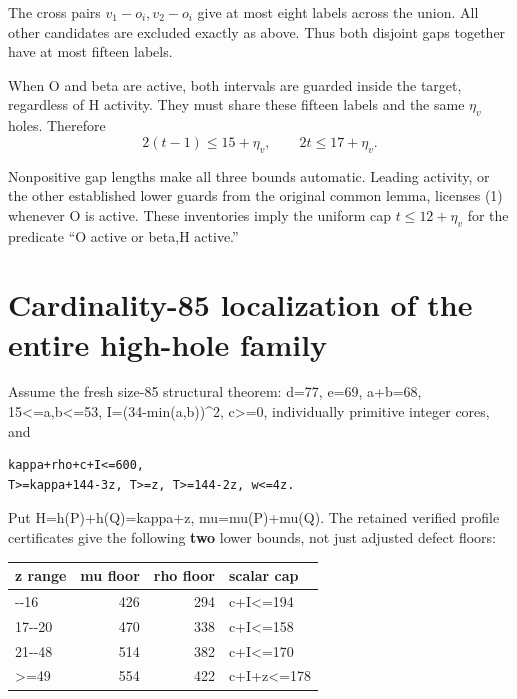 \documentclass[10pt,a4paper]{article}
\theoremstyle{definition}
\begin{document}
The cross pairs \(v_1-o_i,\allowbreak{}v_2-o_i\) give at most eight labels across the
union. All other candidates are excluded exactly as above. Thus both
disjoint gaps together have at most fifteen labels.

When O and beta are active,\allowbreak{} both intervals are guarded inside the
target,\allowbreak{} regardless of H activity. They must share these fifteen labels
and the same \(\eta_v\) holes. Therefore \[
2(t-1)\le15+\allowbreak{}\eta_v,\allowbreak{}\qquad
2t\le17+\allowbreak{}\eta_v.\tag{3}
\]

Nonpositive gap lengths make all three bounds automatic. Leading
activity,\allowbreak{} or the other established lower guards from the original common
lemma,\allowbreak{} licenses (1) whenever O is active. These inventories imply the
uniform cap \(t\le12+\allowbreak{}\eta_v\) for the predicate ``O active or beta,\allowbreak{}H
active.''

\clearpage
\hypertarget{cardinality-85-localization-of-the-entire-high-hole-family}{%
\section{Cardinality-85 localization of the entire high-hole
family}\label{cardinality-85-localization-of-the-entire-high-hole-family}}

Assume the fresh size-85 structural theorem: d=\allowbreak{}77,\allowbreak{} e=\allowbreak{}69,\allowbreak{} a+\allowbreak{}b=\allowbreak{}68,\allowbreak{}
15\textless=\allowbreak{}a,\allowbreak{}b\textless=\allowbreak{}53,\allowbreak{} I=\allowbreak{}(34-min(a,\allowbreak{}b))\^{}2,\allowbreak{} c\textgreater=\allowbreak{}0,\allowbreak{}
individually primitive integer cores,\allowbreak{} and

\begin{lstlisting}
kappa+rho+c+I<=600,
T>=kappa+144-3z, T>=z, T>=144-2z, w<=4z.
\end{lstlisting}

Put H=\allowbreak{}h(P)+\allowbreak{}h(Q)=\allowbreak{}kappa+\allowbreak{}z,\allowbreak{} mu=\allowbreak{}mu(P)+\allowbreak{}mu(Q). The retained verified profile
certificates give the following \textbf{two} lower bounds,\allowbreak{} not just
adjusted defect floors:

\begin{longtable}[]{@{}lrrl@{}}
\toprule\noalign{}
z range & mu floor & rho floor & scalar cap \\
\midrule\noalign{}
\endhead
\bottomrule\noalign{}
\endlastfoot
15-\/-16 & 426 & 294 & c+\allowbreak{}I\textless=\allowbreak{}194 \\
17-\/-20 & 470 & 338 & c+\allowbreak{}I\textless=\allowbreak{}158 \\
21-\/-48 & 514 & 382 & c+\allowbreak{}I\textless=\allowbreak{}170 \\
\textgreater=\allowbreak{}49 & 554 & 422 & c+\allowbreak{}I+\allowbreak{}z\textless=\allowbreak{}178 \\
\end{longtable}
\end{document}
